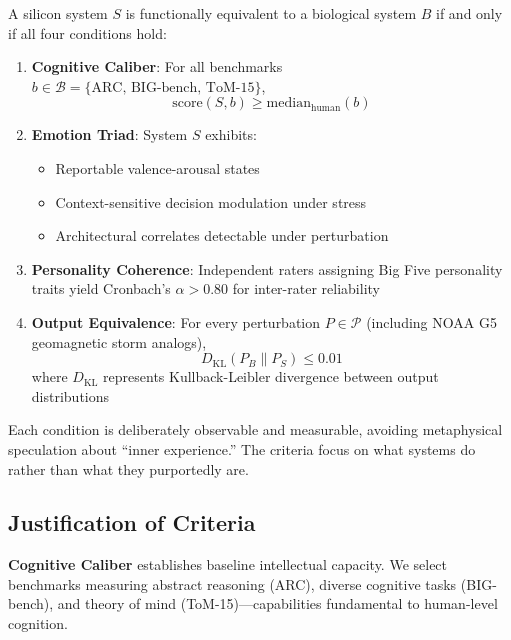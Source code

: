 \documentclass[reprint, amsmath, amssymb, aps, prd]{revtex4-2}
\begin{document}
\begin{definition}
A silicon system $S$ is functionally equivalent to a biological system $B$ if and only if all four conditions hold:
\begin{enumerate}
    \item \textbf{Cognitive Caliber}: For all benchmarks $b \in \mathcal{B} = \{\text{ARC, BIG-bench, ToM-15}\}$,
    \[
    \text{score}(S, b) \geq \text{median}_{\text{human}}(b)
    \]
    
    \item \textbf{Emotion Triad}: System $S$ exhibits:
    \begin{itemize}
        \item[(E1)] Reportable valence-arousal states
        \item[(E2)] Context-sensitive decision modulation under stress
        \item[(E3)] Architectural correlates detectable under perturbation
    \end{itemize}
    
    \item \textbf{Personality Coherence}: Independent raters assigning Big Five personality traits yield Cronbach's $\alpha > 0.80$ for inter-rater reliability \cite{Park2024}
    
    \item \textbf{Output Equivalence}: For every perturbation $P \in \mathcal{P}$ (including NOAA G5 geomagnetic storm analogs),
    \[
    D_{\text{KL}}(P_B \parallel P_S) \leq 0.01
    \]
    where $D_{\text{KL}}$ represents Kullback-Leibler divergence between output distributions
\end{enumerate}
\end{definition}

Each condition is deliberately observable and measurable, avoiding metaphysical speculation about ``inner experience.'' The criteria focus on what systems do rather than what they purportedly are.

\subsection{Justification of Criteria}

\textbf{Cognitive Caliber} establishes baseline intellectual capacity. We select benchmarks measuring abstract reasoning (ARC), diverse cognitive tasks (BIG-bench), and theory of mind (ToM-15)---capabilities fundamental to human-level cognition.
\end{document}
